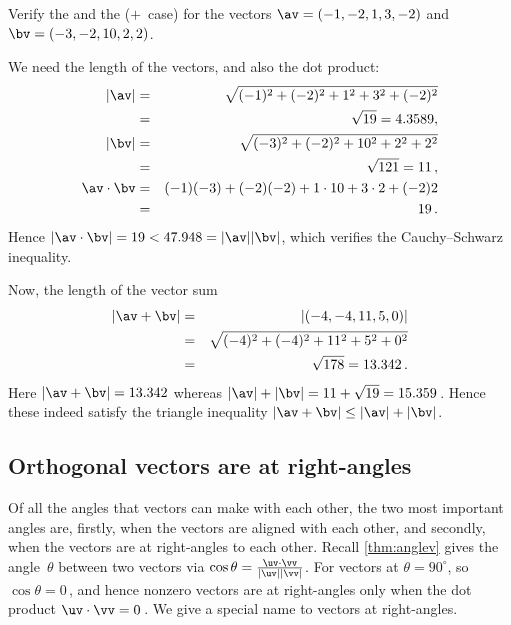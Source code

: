 \begin{example} 
Verify the  and the  (\(+\)~case) for the vectors \(\av=(-1,-2,1,3,-2)\) and \(\bv=(-3,-2,10,2,2)\).
\begin{solution} 
We need the length of the vectors, and also the dot product:
\begin{eqnarray*}
|\av|&=&\sqrt{(-1)^2+(-2)^2+1^2+3^2+(-2)^2}
\\&=&\sqrt{19}=4.3589,
\\|\bv|&=&\sqrt{(-3)^2+(-2)^2+10^2+2^2+2^2}
\\&=&\sqrt{121}=11\,,
\\
\av\cdot\bv
&=&(-1)(-3)+(-2)(-2)+1\cdot10+3\cdot2+(-2)2
\\&=&19\,.
\end{eqnarray*}
Hence \(|\av\cdot\bv|=19<47.948=|\av||\bv|\), which verifies the Cauchy--Schwarz inequality.

Now, the length of the vector sum
\begin{eqnarray*}
|\av+\bv|&=&|(-4,-4,11,5,0)|
\\&=&\sqrt{(-4)^2+(-4)^2+11^2+5^2+0^2}
\\&=&\sqrt{178}=13.342\,.
\end{eqnarray*}
Here \(|\av+\bv|=13.342\) whereas \(|\av|+|\bv|=11+\sqrt{19}=15.359\)\,.
Hence these indeed satisfy the triangle inequality \(|\av+\bv|\leq|\av|+|\bv|\).
\end{solution}
\end{example}








\subsection{Orthogonal vectors are at right-angles}
\label{sec:ovra}


Of all the angles that vectors can make with each other, the two most important angles are, firstly, when the vectors are aligned with each other, and secondly, when the vectors are at right-angles to each other.
Recall \cref{thm:anglev} gives the angle~\(\theta\) between two vectors via \(\cos\theta=\frac{\uv\cdot\vv}{|\uv||\vv|}\).
For vectors at  \(\theta=90^\circ\),  so \(\cos\theta=0\)\,, and hence nonzero vectors are at right-angles only when the dot product \(\uv\cdot\vv=0\)\,.
We give a special name to vectors at right-angles.


